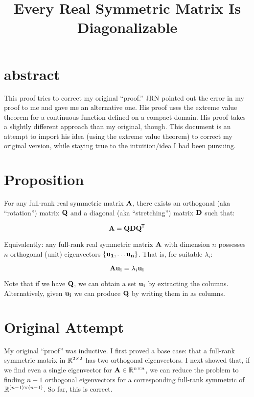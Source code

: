 \documentclass[11pt, oneside]{amsart}
\begin{document}
\title{Every Real Symmetric Matrix Is Diagonalizable}
\maketitle

\section{abstract}

This proof tries to correct my original ``proof.'' JRN pointed out the
error in my proof to me and gave me an alternative one. His proof uses
the extreme value theorem for a continuous function defined on a compact
domain. His proof takes a slightly different approach than my original,
though. This document is an attempt to import his idea (using the
extreme value theorem) to correct my original version, while staying
true to the intuition/idea I had been pursuing.

\section{Proposition}

\begin{theorem}
  For any full-rank real symmetric matrix $\mtxA$, there exists an
  orthogonal (aka ``rotation'') matrix $\mtxQ$ and a diagonal (aka
  ``stretching'') matrix $\mtxD$ such that:

  \[
    \mtxA = \mtxQDQt
  \]

  Equivalently: any full-rank real symmetric matrix $\mtxA$ with
  dimension $n$ possesses $n$ orthogonal (unit) eigenvectors $\setof{
  \vecu[1], \ldots \vecu[n] }$. That is, for suitable $\lambda_i$:

  \[
    \mtxA \vecu[i] = \lambda_i \vecu[i]
  \]

  Note that if we have $\mtxQ$, we can obtain a set $\vecu[i]$ by
  extracting the columns. Alternatively, given $\vecu[i]$ we can
  produce $\mtxQ$ by writing them in as columns.
\end{theorem}

\section{Original Attempt}

My original ``proof'' was inductive. I first proved a base case: that a
full-rank symmetric matrix in $\mtxspace{2}$ has two orthogonal
eigenvectors. I next showed that, if we find even a single eigenvector
for $\mtxA \in \mtxspace{n}$, we can reduce the problem to finding $n-1$
orthogonal eigenvectors for a corresponding full-rank symmetric of
$\mtxspace{(n-1)}$. So far, this is correct.
\end{document}
